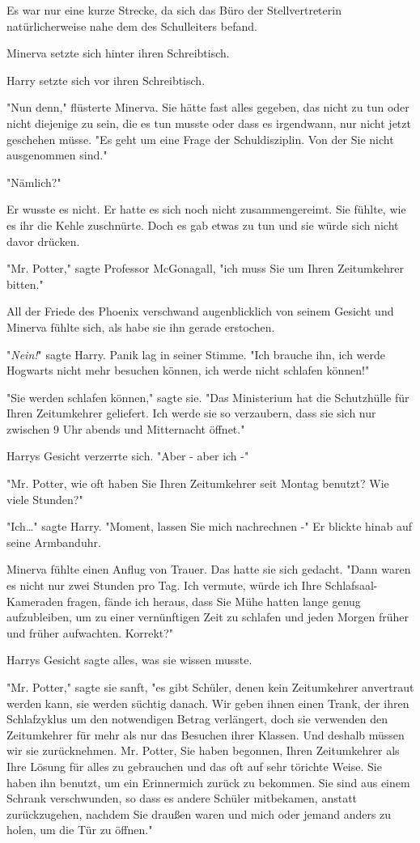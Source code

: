{Es war nur eine kurze Strecke, da sich das Büro der Stellvertreterin natürlicherweise nahe dem des Schulleiters befand.

Minerva setzte sich hinter ihren Schreibtisch.

Harry setzte sich vor ihren Schreibtisch.

"Nun denn," flüsterte Minerva. Sie hätte fast alles gegeben, das nicht zu tun oder nicht diejenige zu sein, die es tun musste oder dass es irgendwann, nur nicht jetzt geschehen müsse. "Es geht um eine Frage der Schuldisziplin. Von der Sie nicht ausgenommen sind."

"Nämlich?"

Er wusste es nicht. Er hatte es sich noch nicht zusammengereimt. Sie fühlte, wie es ihr die Kehle zuschnürte. Doch es gab etwas zu tun und sie würde sich nicht davor drücken.

"Mr. Potter," sagte Professor McGonagall, "ich muss Sie um Ihren Zeitumkehrer bitten."

All der Friede des Phoenix verschwand augenblicklich von seinem Gesicht und Minerva fühlte sich, als habe sie ihn gerade erstochen.

"\emph{Nein!}" sagte Harry. Panik lag in seiner Stimme. "Ich brauche ihn, ich werde Hogwarts nicht mehr besuchen können, ich werde nicht schlafen können!"

"Sie werden schlafen können," sagte sie. "Das Ministerium hat die Schutzhülle für Ihren Zeitumkehrer geliefert. Ich werde sie so verzaubern, dass sie sich nur zwischen 9 Uhr abends und Mitternacht öffnet."

Harrys Gesicht verzerrte sich. "Aber - aber ich -"

"Mr. Potter, wie oft haben Sie Ihren Zeitumkehrer seit Montag benutzt? Wie viele Stunden?"

"Ich…" sagte Harry. "Moment, lassen Sie mich nachrechnen -" Er blickte hinab auf seine Armbanduhr.

Minerva fühlte einen Anflug von Trauer. Das hatte sie sich gedacht. "Dann waren es nicht nur zwei Stunden pro Tag. Ich vermute, würde ich Ihre Schlafsaal-Kameraden fragen, fände ich heraus, dass Sie Mühe hatten lange genug aufzubleiben, um zu einer vernünftigen Zeit zu schlafen und jeden Morgen früher und früher aufwachten. Korrekt?"

Harrys Gesicht sagte alles, was sie wissen musste.

"Mr. Potter," sagte sie sanft, "es gibt Schüler, denen kein Zeitumkehrer anvertraut werden kann, sie werden süchtig danach. Wir geben ihnen einen Trank, der ihren Schlafzyklus um den notwendigen Betrag verlängert, doch sie verwenden den Zeitumkehrer für mehr als nur das Besuchen ihrer Klassen. Und deshalb müssen wir sie zurücknehmen. Mr. Potter, Sie haben begonnen, Ihren Zeitumkehrer als Ihre Lösung für alles zu gebrauchen und das oft auf sehr törichte Weise. Sie haben ihn benutzt, um ein Erinnermich zurück zu bekommen. Sie sind aus einem Schrank verschwunden, so dass es andere Schüler mitbekamen, anstatt zurückzugehen, nachdem Sie draußen waren und mich oder jemand anders zu holen, um die Tür zu öffnen."

}
